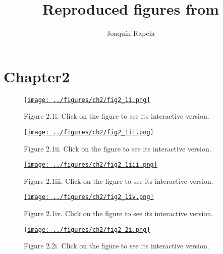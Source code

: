 \documentclass{article}
\title{Reproduced figures from\\\citet{durbinAndKoopman12}}
\author{Joaqu\'{i}n Rapela}
\begin{document}
\maketitle

\section{Chapter2}

\begin{figure}[h]
    \begin{center}
        \href{http://www.gatsby.ucl.ac.uk/~rapela/durbinAndKoopman12/figures/ch2/fig2_1i.html}{\texttt{[image: ../figures/ch2/fig2\_1i.png]}}
    \end{center}
    \caption{Figure 2.1i. Click on the figure to see its interactive version.}
\end{figure}

\begin{figure}[h]
    \begin{center}
        \href{http://www.gatsby.ucl.ac.uk/~rapela/durbinAndKoopman12/figures/ch2/fig2_1ii.html}{\texttt{[image: ../figures/ch2/fig2\_1ii.png]}}
    \end{center}
    \caption{Figure 2.1ii. Click on the figure to see its interactive version.}
\end{figure}

\begin{figure}[h]
    \begin{center}
        \href{http://www.gatsby.ucl.ac.uk/~rapela/durbinAndKoopman12/figures/ch2/fig2_1iii.html}{\texttt{[image: ../figures/ch2/fig2\_1iii.png]}}
    \end{center}
    \caption{Figure 2.1iii. Click on the figure to see its interactive version.}
\end{figure}

\begin{figure}[h]
    \begin{center}
        \href{http://www.gatsby.ucl.ac.uk/~rapela/durbinAndKoopman12/figures/ch2/fig2_1iv.html}{\texttt{[image: ../figures/ch2/fig2\_1iv.png]}}
    \end{center}
    \caption{Figure 2.1iv. Click on the figure to see its interactive version.}
\end{figure}

\begin{figure}[h]
    \begin{center}
        \href{http://www.gatsby.ucl.ac.uk/~rapela/durbinAndKoopman12/figures/ch2/fig2_2i.html}{\texttt{[image: ../figures/ch2/fig2\_2i.png]}}
    \end{center}
    \caption{Figure 2.2i. Click on the figure to see its interactive version.}
\end{figure}
\end{document}
